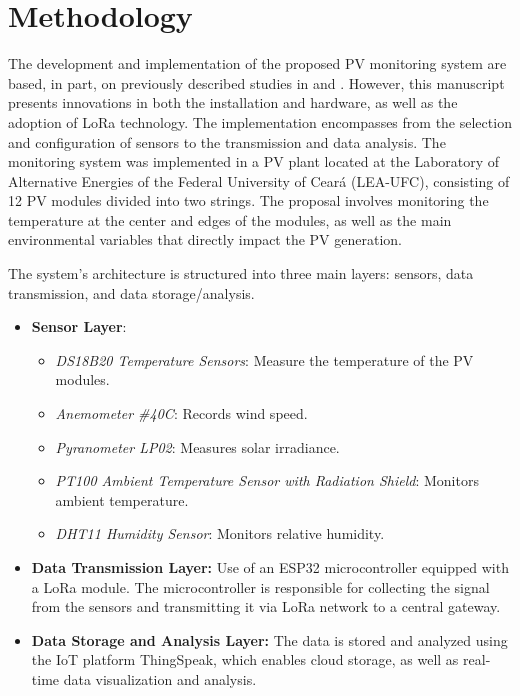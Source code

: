 \section{Methodology}
\label{sec:met}
The development and implementation of the proposed PV monitoring system are based, in part, on previously described studies in \cite{pereira2019iot2} and \cite{araripe2024monitoramento}. However, this manuscript presents innovations in both the installation and hardware, as well as the adoption of LoRa technology. The implementation encompasses from the selection and configuration of sensors to the transmission and data analysis. The monitoring system was implemented in a PV plant located at the Laboratory of Alternative Energies of the Federal University of Ceará (LEA-UFC), consisting of 12 PV modules divided into two strings. The proposal involves monitoring the temperature at the center and edges of the modules, as well as the main environmental variables that directly impact the PV generation.

The system's architecture is structured into three main layers: sensors, data transmission, and data storage/analysis.

\begin{itemize}
\item \textbf{Sensor Layer}: 
\begin{itemize}
    \item \textit{DS18B20 Temperature Sensors}: Measure the temperature of the PV modules.
    \item \textit{Anemometer \#40C}: Records wind speed.
    \item \textit{Pyranometer LP02}: Measures solar irradiance.
    \item \textit{PT100 Ambient Temperature Sensor with Radiation Shield}: Monitors ambient temperature.
    \item \textit{DHT11 Humidity Sensor}: Monitors relative humidity.
\end{itemize}

\item \textbf{Data Transmission Layer:} Use of an ESP32 microcontroller equipped with a LoRa module. The microcontroller is responsible for collecting the signal from the sensors and transmitting it via LoRa network to a central gateway.

\item \textbf{Data Storage and Analysis Layer:} The data is stored and analyzed using the IoT platform ThingSpeak, which enables cloud storage, as well as real-time data visualization and analysis. 

\end{itemize}

